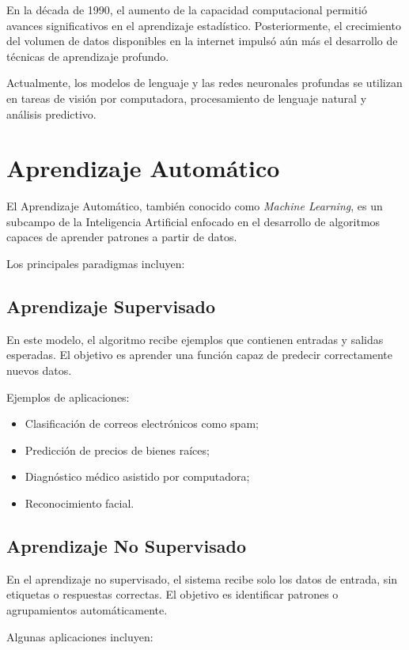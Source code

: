 \documentclass[11pt]{article}
\begin{document}
En la década de 1990, el aumento de la capacidad computacional permitió avances significativos en el
aprendizaje estadístico. Posteriormente, el crecimiento del volumen de datos disponibles en la
internet impulsó aún más el desarrollo de técnicas de aprendizaje profundo.

Actualmente, los modelos de lenguaje y las redes neuronales profundas se utilizan en tareas de visión
por computadora, procesamiento de lenguaje natural y análisis predictivo.
 

\section{Aprendizaje Automático}

El Aprendizaje Automático, también conocido como \textit{Machine Learning}, es un subcampo de la
Inteligencia Artificial enfocado en el desarrollo de algoritmos capaces de aprender patrones a
partir de datos.

Los principales paradigmas incluyen: 

\subsection{Aprendizaje Supervisado}

En este modelo, el algoritmo recibe ejemplos que contienen entradas y salidas esperadas. El objetivo es
aprender una función capaz de predecir correctamente nuevos datos.

Ejemplos de aplicaciones:

\begin{itemize}
    \item Clasificación de correos electrónicos como spam;
    \item Predicción de precios de bienes raíces;
    \item Diagnóstico médico asistido por computadora;
    \item Reconocimiento facial.
\end{itemize}
 

\subsection{Aprendizaje No Supervisado}

En el aprendizaje no supervisado, el sistema recibe solo los datos de entrada, sin etiquetas
o respuestas correctas. El objetivo es identificar patrones o agrupamientos automáticamente.

Algunas aplicaciones incluyen:
\end{document}
